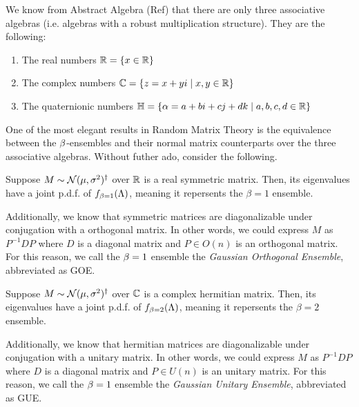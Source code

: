 We know from Abstract Algebra (Ref) that there are only three associative algebras (i.e. algebras with a robust multiplication structure).
They are the following:
\begin{enumerate}
  \item The real numbers $\mathbb{R} = \{ x \in \mathbb{R} \}$
  \item The complex numbers $\mathbb{C} = \{ z = x + yi \mid x,y \in \mathbb{R} \}$
  \item The quaternionic numbers $\mathbb{H} = \{ \alpha = a + bi + cj + dk \mid a,b,c,d \in \mathbb{R} \}$
\end{enumerate}


One of the most elegant results in Random Matrix Theory is the equivalence between the $\beta$-ensembles
and their normal matrix counterparts over the three associative algebras. Without futher ado, consider the following.

\medskip

 Suppose $M \sim \mathcal{N}(\mu,\sigma^2)^\dagger$ over $\mathbb{R}$ is a real symmetric matrix.
Then, its eigenvalues have a joint p.d.f. of $f_{\beta = 1}(\Lambda)$, meaning it repersents the $\beta = 1$ ensemble.

Additionally, we know that symmetric matrices are diagonalizable under conjugation with a orthogonal matrix.
In other words, we could express $M$ as $P^{-1} D P$ where $D$ is a diagonal matrix and $P \in O(n)$ is an orthogonal matrix.
For this reason, we call the $\beta = 1$ ensemble the \textit{Gaussian Orthogonal Ensemble}, abbreviated as GOE.

\bigskip

 Suppose $M \sim \mathcal{N}(\mu,\sigma^2)^\dagger$ over $\mathbb{C}$ is a complex hermitian matrix.
Then, its eigenvalues have a joint p.d.f. of $f_{\beta = 2}(\Lambda)$, meaning it repersents the $\beta = 2$ ensemble.

Additionally, we know that hermitian matrices are diagonalizable under conjugation with a unitary matrix.
In other words, we could express $M$ as $P^{-1} D P$ where $D$ is a diagonal matrix and $P \in U(n)$ is an unitary matrix.
For this reason, we call the $\beta = 1$ ensemble the \textit{Gaussian Unitary Ensemble}, abbreviated as GUE.


